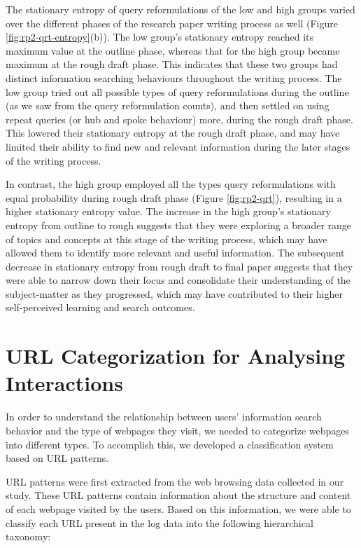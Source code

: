 \documentclass[letterpaper, nobind]{templates/ociamthesis}
\begin{document}
The stationary entropy of query reformulations of the low and high groups varied over the different phases of the research paper writing process as well (Figure \ref{fig:rp2-qrt-entropy}(b)).
The low group's stationary entropy reached its maximum value at the outline phase, whereas that for the high group became maximum at the rough draft phase.
This indicates that these two groups had distinct information searching behaviours throughout the writing process.
The low group tried out all possible types of query reformulations during the outline (as we saw from the query reformulation counts), and then settled on using repeat queries (or hub and spoke behaviour) more, during the rough draft phase.
This lowered their stationary entropy at the rough draft phase, and may have limited their ability to find new and relevant information during the later stages of the writing process.

In contrast, the high group employed all the types query reformulations with equal probability during rough draft phase (Figure \ref{fig:rp2-qrt}), resulting in a higher stationary entropy value.
The increase in the high group's stationary entropy from outline to rough suggests that they were exploring a broader range of topics and concepts at this stage of the writing process, which may have allowed them to identify more relevant and useful information.
The subsequent decrease in stationary entropy from rough draft to final paper suggests that they were able to narrow down their focus and consolidate their understanding of the subject-matter as they progressed, which may have contributed to their higher self-perceived learning and search outcomes.

\hypertarget{sec-res-url-categorization}{%
\section{URL Categorization for Analysing Interactions}\label{sec-res-url-categorization}}

In order to understand the relationship between users' information search behavior and the type of webpages they visit, we needed to categorize webpages into different types. To accomplish this, we developed a classification system based on URL patterns.

URL patterns were first extracted from the web browsing data collected in our study. These URL patterns contain information about the structure and content of each webpage visited by the users. Based on this information, we were able to classify each URL present in the log data into the following hierarchical taxonomy:
\end{document}
